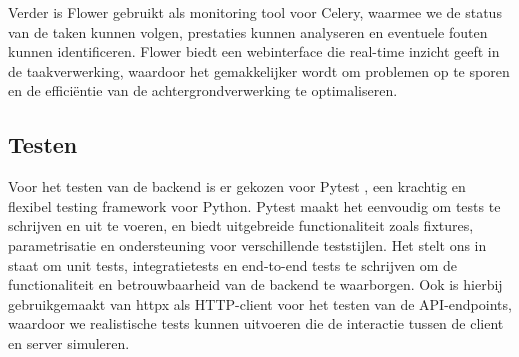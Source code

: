 Verder is Flower \autocite{Flower} gebruikt als monitoring tool voor Celery, waarmee we de status van de taken kunnen volgen, prestaties kunnen analyseren en eventuele fouten kunnen identificeren. 
Flower biedt een webinterface die real-time inzicht geeft in de taakverwerking, waardoor het gemakkelijker wordt om problemen op te sporen en de efficiëntie van de achtergrondverwerking te optimaliseren.

\subsection{Testen} 
Voor het testen van de backend is er gekozen voor Pytest \autocite{Pytest}, een krachtig en flexibel testing framework voor Python. 
Pytest maakt het eenvoudig om tests te schrijven en uit te voeren, en biedt uitgebreide functionaliteit zoals fixtures, parametrisatie en ondersteuning voor verschillende teststijlen. 
Het stelt ons in staat om unit tests, integratietests en end-to-end tests te schrijven om de functionaliteit en betrouwbaarheid van de backend te waarborgen. 
Ook is hierbij gebruikgemaakt van httpx \autocite{HTTPX} als HTTP-client voor het testen van de API-endpoints, waardoor we realistische tests kunnen uitvoeren die de interactie tussen de client en server simuleren.

